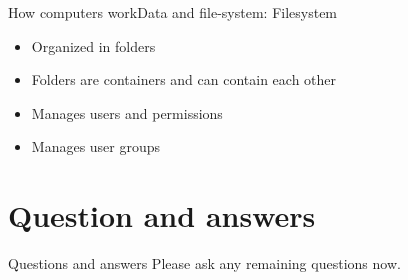 \documentclass[aspectratio=169]{beamer}
\begin{document}
\begin{frame}{How computers work}{Data and file-system: Filesystem}
\begin{itemize}
	\item Organized in folders
	\item Folders are containers and can contain each other
	\item Manages users and permissions
	\item Manages user groups
\end{itemize}
\end{frame}

\section{Question and answers}
\begin{frame}{Questions and answers}
\huge
\centering
Please ask any remaining questions now.
\end{frame}
\end{document}
